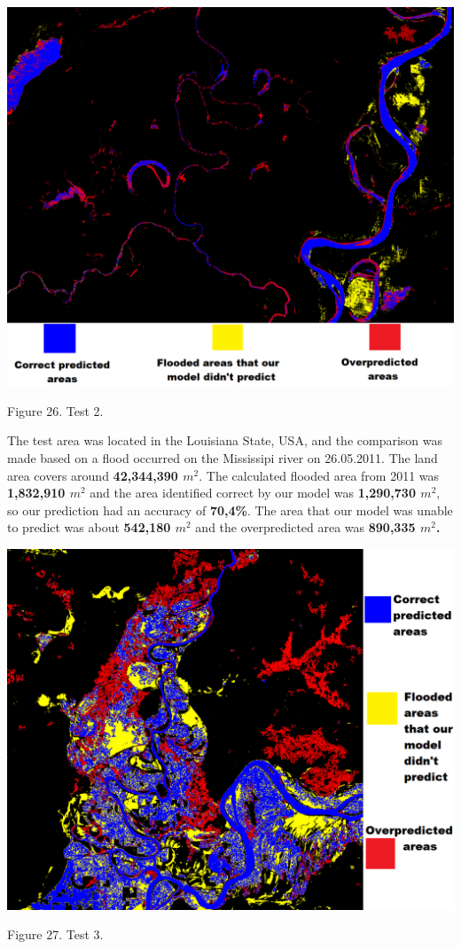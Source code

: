 \documentclass[12pt, a4paper]{report}
\begin{document}
\newpage

\bigskip
\includegraphics[scale=0.5, center]{test_2.png}
\begin{center}
Figure 26. Test 2. 
\end{center}
\par 

The test area was located in the Louisiana State, USA, and the comparison was made based on a flood occurred on the Mississipi river on 26.05.2011. The land area covers around \textbf{42,344,390 $m^2$}. The calculated flooded area from 2011 was \textbf{1,832,910 $m^2$} and the area identified correct by our model was \textbf{1,290,730 $m^2$}, so our prediction had an accuracy of \textbf{70,4\%}. The area that our model was unable to predict was about \textbf{542,180 $m^2$} and the overpredicted area was \textbf{890,335 $m^2$.}

\newpage

\bigskip
\includegraphics[scale=0.6, center]{test_3.png}
\begin{center}
Figure 27. Test 3.
\end{center}
\par 
\end{document}
